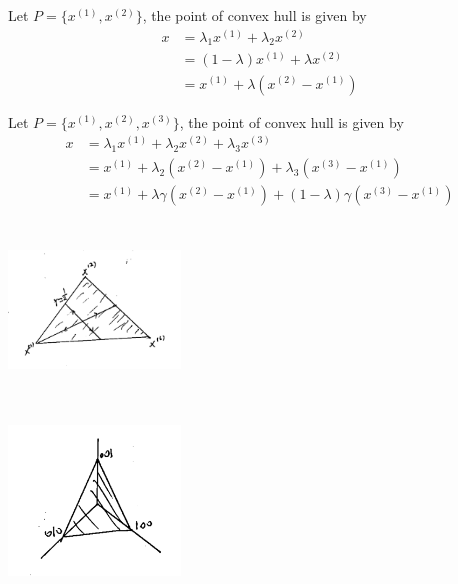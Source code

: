 \begin{example}
Let $P = \{x^{(1)},  x^{(2)}\}$, the point of convex hull is given by 
\begin{align*}
x 
&= \lambda_1x^{(1)} + \lambda_2x^{(2)}\\
&= (1-\lambda)x^{(1)} + \lambda x^{(2)}\\
&= x^{(1)} + \lambda(x^{(2)} - x^{(1)})
\end{align*}

\vspace{0.3cm}
Let $P = \{x^{(1)},  x^{(2)}, x^{(3)} \}$, the point of convex hull is given by 
\begin{align*}
x 
&= \lambda_1x^{(1)} + \lambda_2x^{(2)} + \lambda_3x^{(3)}\\
&= x^{(1)} + \lambda_2(x^{(2)} - x^{(1)}) + \lambda_3(x^{(3)} - x^{(1)})\\
&= x^{(1)} + \lambda \gamma(x^{(2)} - x^{(1)}) + (1 - \lambda)\gamma(x^{(3)} - x^{(1)})
\end{align*}


\begin{marginfigure}
	\centering
	\includegraphics[width=1.8in,height=1.8in]{figures/ch08/figure1023_2.png}
\end{marginfigure}

\begin{marginfigure}
	\centering
	\includegraphics[width=1.8in,height=1.8in]{figures/ch08/figure1023_3.png}
\end{marginfigure}

\end{example}


